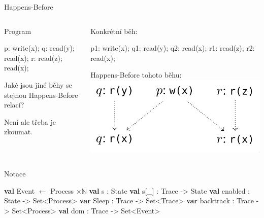 \documentclass[11pt]{beamer}
\begin{document}
\begin{frame}[fragile]{Happens-Before}
\begin{columns}

\begin{column}{0.5\textwidth}
Program
\begin{semiverbatim} \small
p: write(x);
q: read(y); read(x);
r: read(z); read(x);
\end{semiverbatim}

Jaké jsou jiné běhy se stejnou Happens-Before relací?



Není ale třeba je zkoumat.

\end{column}
\begin{column}{0.5\textwidth}
\pause
Konkrétní běh:
\begin{semiverbatim} \small
p1: write(x);
q1: read(y);
q2: read(x);
r1: read(z);
r2: read(x);
\end{semiverbatim}
\pause
Happens-Before tohoto běhu:
\pause
\includegraphics[width=0.9\linewidth]{img/hb1.png}
\end{column}
\end{columns}
\end{frame}


\begin{frame}[fragile]{Notace}
\begin{algorithmic}
\pause \State \textbf{val} Event $ \gets $ Process $ \times \mathbb{N}$
\pause \State \textbf{val} s : State \pause {}
\pause \State \textbf{val} s[\_] : Trace -> State \pause {}
\pause \State \textbf{val} enabled : State -> Set<Process>
\pause \State \textbf{var} Sleep : Trace -> Set<Trace> \pause {}
\pause \State \textbf{var} backtrack : Trace -> Set<Process>
\pause \State \textbf{val} dom : Trace -> Set<Event>
\end{algorithmic}
\end{frame}
\end{document}
